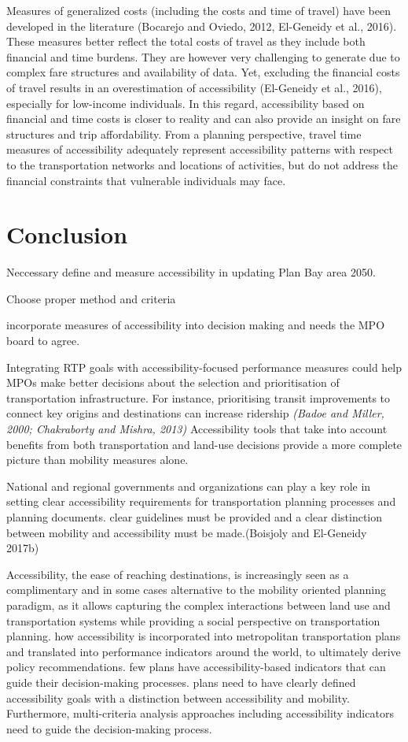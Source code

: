 \documentclass[12pt,]{article}
\begin{document}
Measures of generalized costs (including the costs and time of travel)
have been developed in the literature (Bocarejo and Oviedo, 2012,
El-Geneidy et al., 2016). These measures better reflect the total costs
of travel as they include both financial and time burdens. They are
however very challenging to generate due to complex fare structures and
availability of data. Yet, excluding the financial costs of travel
results in an overestimation of accessibility (El-Geneidy et al., 2016),
especially for low-income individuals. In this regard, accessibility
based on financial and time costs is closer to reality and can also
provide an insight on fare structures and trip affordability. From a
planning perspective, travel time measures of accessibility adequately
represent accessibility patterns with respect to the transportation
networks and locations of activities, but do not address the financial
constraints that vulnerable individuals may face.

\hypertarget{conclusion}{%
\section{Conclusion}\label{conclusion}}

Neccessary define and measure accessibility in updating Plan Bay area
2050.

Choose proper method and criteria

incorporate measures of accessibility into decision making and needs the
MPO board to agree.

Integrating RTP goals with accessibility-focused performance measures
could help MPOs make better decisions about the selection and
prioritisation of transportation infrastructure. For instance,
prioritising transit improvements to connect key origins and
destinations can increase ridership \emph{(Badoe and Miller, 2000;
Chakraborty and Mishra, 2013)} Accessibility tools that take into
account benefits from both transportation and land-use decisions provide
a more complete picture than mobility measures alone.

National and regional governments and organizations can play a key role
in setting clear accessibility requirements for transportation planning
processes and planning documents. clear guidelines must be provided and
a clear distinction between mobility and accessibility must be
made.(Boisjoly and El-Geneidy 2017b)

Accessibility, the ease of reaching destinations, is increasingly seen
as a complimentary and in some cases alternative to the mobility
oriented planning paradigm, as it allows capturing the complex
interactions between land use and transportation systems while providing
a social perspective on transportation planning. how accessibility is
incorporated into metropolitan transportation plans and translated into
performance indicators around the world, to ultimately derive policy
recommendations. few plans have accessibility-based indicators that can
guide their decision-making processes. plans need to have clearly
defined accessibility goals with a distinction between accessibility and
mobility. Furthermore, multi-criteria analysis approaches including
accessibility indicators need to guide the decision-making process.
\end{document}
